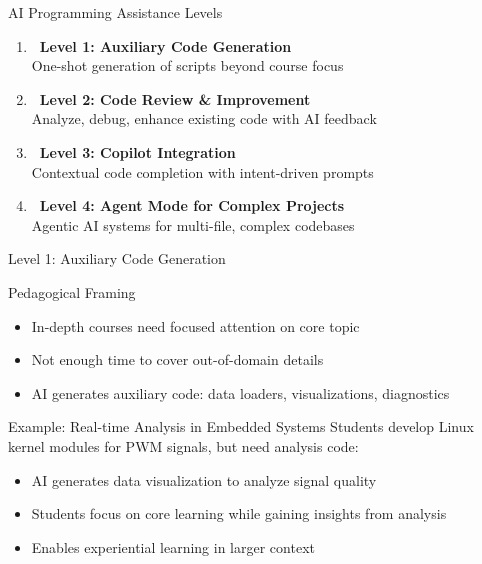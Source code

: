 \documentclass{beamer}
\begin{document}
\begin{frame}{AI Programming Assistance Levels}
    \begin{tcolorbox}[colback=myblue!5,colframe=myblue,title=Increasing Complexity \& Integration]
        \begin{enumerate}
            \item \textbf{\textcolor{myblue}{\faRocket~Level 1:} Auxiliary Code Generation}\\
            One-shot generation of scripts beyond course focus
            
            \item \textbf{\textcolor{myred}{\faSearch~Level 2:} Code Review \& Improvement}\\
            Analyze, debug, enhance existing code with AI feedback
            
            \item \textbf{\textcolor{mygreen}{\faBrain~Level 3:} Copilot Integration}\\
            Contextual code completion with intent-driven prompts
            
            \item \textbf{\textcolor{mypurple}{\faPuzzlePiece~Level 4:} Agent Mode for Complex Projects}\\
            Agentic AI systems for multi-file, complex codebases
        \end{enumerate}
    \end{tcolorbox}
\end{frame}

\begin{frame}{Level 1: Auxiliary Code Generation}
    \begin{block}{Pedagogical Framing}
        \begin{itemize}
            \item In-depth courses need focused attention on core topic
            \item Not enough time to cover out-of-domain details
            \item AI generates auxiliary code: data loaders, visualizations, diagnostics
        \end{itemize}
    \end{block}
    
    \begin{alertblock}{Example: Real-time Analysis in Embedded Systems}
        Students develop Linux kernel modules for PWM signals, but need analysis code:
        \begin{itemize}
            \item AI generates data visualization to analyze signal quality
            \item Students focus on core learning while gaining insights from analysis
            \item Enables experiential learning in larger context
        \end{itemize}
    \end{alertblock}
\end{frame}
\end{document}
